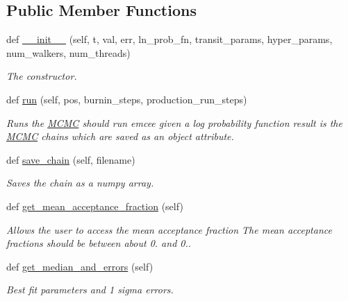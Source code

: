 \subsection*{Public Member Functions}
\begin{DoxyCompactItemize}
\item 
def \hyperlink{classexospec_1_1mcmc_1_1_m_c_m_c_aae17f42d9fa567e61df69f7c808aa931}{\+\_\+\+\_\+init\+\_\+\+\_\+} (self, t, val, err, ln\+\_\+prob\+\_\+fn, transit\+\_\+params, hyper\+\_\+params, num\+\_\+walkers, num\+\_\+threads)
\begin{DoxyCompactList}\small\item\em The constructor. \end{DoxyCompactList}\item 
def \hyperlink{classexospec_1_1mcmc_1_1_m_c_m_c_af103863b006ff9225432bdc8b2e90d81}{run} (self, pos, burnin\+\_\+steps, production\+\_\+run\+\_\+steps)
\begin{DoxyCompactList}\small\item\em Runs the \hyperlink{classexospec_1_1mcmc_1_1_m_c_m_c}{M\+C\+MC} should run emcee given a log probability function result is the \hyperlink{classexospec_1_1mcmc_1_1_m_c_m_c}{M\+C\+MC} chains which are saved as an object attribute. \end{DoxyCompactList}\item 
def \hyperlink{classexospec_1_1mcmc_1_1_m_c_m_c_ad20ecaec3fc481c3ab87ad7c4c0439bc}{save\+\_\+chain} (self, filename)
\begin{DoxyCompactList}\small\item\em Saves the chain as a numpy array. \end{DoxyCompactList}\item 
def \hyperlink{classexospec_1_1mcmc_1_1_m_c_m_c_afec10cdfb36657e6e1c013bbd563bd71}{get\+\_\+mean\+\_\+acceptance\+\_\+fraction} (self)
\begin{DoxyCompactList}\small\item\em Allows the user to access the mean acceptance fraction The mean acceptance fractions should be between about 0. and 0.. \end{DoxyCompactList}\item 
def \hyperlink{classexospec_1_1mcmc_1_1_m_c_m_c_a7fe8d9326590fe7cc875fa5118eaa617}{get\+\_\+median\+\_\+and\+\_\+errors} (self)
\begin{DoxyCompactList}\small\item\em Best fit parameters and 1 sigma errors. \end{DoxyCompactList}\item 

\end{DoxyCompactItemize}
